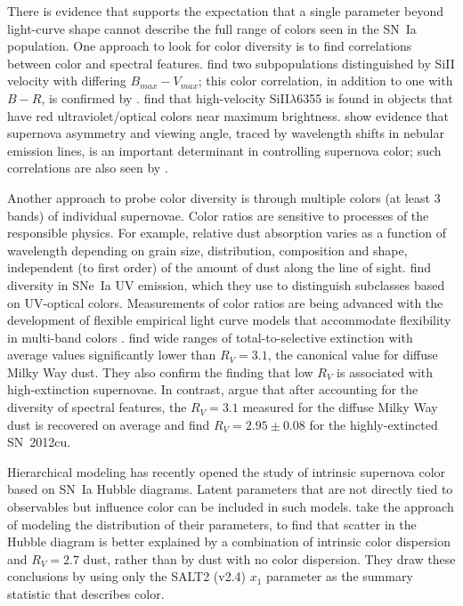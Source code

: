\documentclass{aastex61}   	%
\begin{document}
There is evidence that supports the expectation that a single parameter beyond light-curve shape  cannot describe the full range
of colors seen in the SN~Ia population.  One approach to look for color diversity is to find correlations between color and spectral features.
\citet{2009ApJ...699L.139W, 2011ApJ...729...55F} find two subpopulations distinguished
by SiII velocity with differing $B_{max}-V_{max}$; this color correlation, in addition to one with $B-R$, is confirmed by
\citet{2014ApJ...797...75M}.
\citet{2015MNRAS.451.1973S}
find that high-velocity SiII$\lambda$6355 is found in objects that have red ultraviolet/optical colors near maximum brightness.
\citet{2011MNRAS.413.3075M} show evidence that supernova asymmetry and viewing angle,
traced by wavelength shifts in nebular emission lines, is an important determinant in controlling supernova color; such correlations are also seen by \citet{2011A&A...534L..15C}.

Another approach to probe color diversity is through multiple colors (at least 3 bands)
of individual supernovae.  Color ratios are sensitive to processes of the responsible physics.   For example,
relative dust absorption varies as a function of wavelength depending on grain size, distribution, composition and shape,
independent (to first order) of the amount of dust along the line of sight.
\citet{2013ApJ...779...23M} find diversity in SNe~Ia UV emission, which they use to distinguish subclasses based on UV-optical colors.
Measurements of color ratios are being advanced with the development of flexible empirical light curve models that accommodate flexibility in multi-band colors
\citep[e.g.][]{2011ApJ...731..120M}.
\citet{2014ApJ...789...32B, 2015MNRAS.453.3300A} find wide
ranges of total-to-selective extinction with average values significantly lower than $R_V = 3.1$,
the canonical value for diffuse Milky Way dust.
They also confirm the \citet{2011ApJ...731..120M, 2011ApJ...729...55F} finding that low $R_V$ is associated with high-extinction supernovae.
In contrast, \citet{2011A&A...529L...4C} argue that after accounting for the diversity of spectral features,
the $R_V=3.1$ measured for the diffuse Milky Way dust is recovered on average and \citet{2017arXiv170101422H}
find $R_V=2.95 \pm 0.08$ for the highly-extincted SN~2012cu.

Hierarchical modeling has recently opened
the study of intrinsic supernova color based on SN~Ia Hubble diagrams. Latent parameters that are not directly tied to observables
but  influence color can be included in such models.
\citet{2017ApJ...842...93M} take the approach of modeling the distribution of their parameters, to find that
scatter in the Hubble diagram is better explained by a combination of intrinsic color dispersion and
$R_V=2.7$ dust, rather than by dust with no color dispersion.
They draw these conclusions by using only the SALT2 (v2.4) $x_1$ parameter as the summary statistic that describes color.
\end{document}
